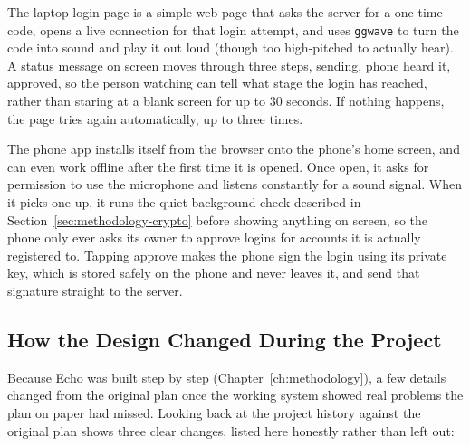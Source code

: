 The laptop login page is a simple web page that asks the server for a
one-time code, opens a live connection for that login attempt, and uses
\texttt{ggwave} to turn the code into sound and play it out loud (though
too high-pitched to actually hear). A status message on screen moves
through three steps, sending, phone heard it, approved, so the person
watching can tell what stage the login has reached, rather than staring
at a blank screen for up to 30 seconds. If nothing happens, the page tries
again automatically, up to three times.

The phone app installs itself from the browser onto the phone's home
screen, and can even work offline after the first time it is opened. Once
open, it asks for permission to use the microphone and listens
constantly for a sound signal. When it picks one up, it runs the quiet
background check described in Section~\ref{sec:methodology-crypto} before
showing anything on screen, so the phone only ever asks its owner to
approve logins for accounts it is actually registered to. Tapping approve
makes the phone sign the login using its private key, which is stored
safely on the phone and never leaves it, and send that signature straight
to the server.

\subsection{How the Design Changed During the Project}
\label{sec:design-evolution}

Because Echo was built step by step (Chapter~\ref{ch:methodology}), a few
details changed from the original plan once the working system showed
real problems the plan on paper had missed. Looking back at the project
history against the original plan shows three clear changes, listed here
honestly rather than left out:

